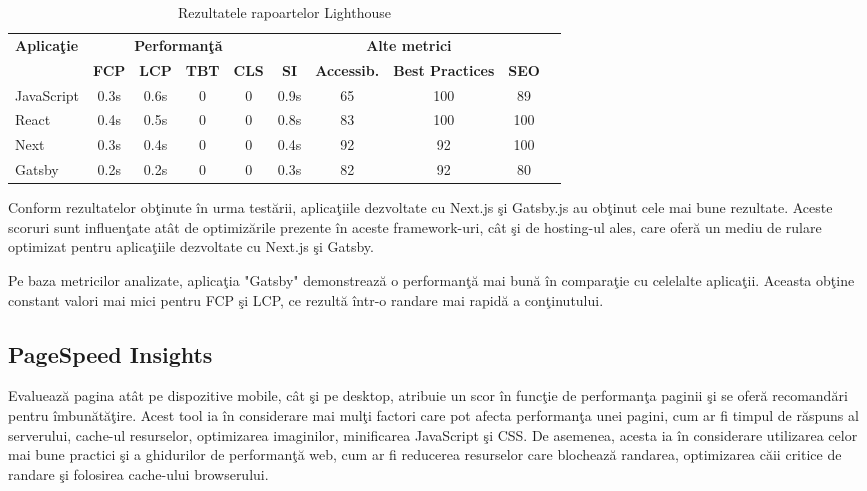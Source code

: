 \documentclass[12pt, a4paper]{report}
\begin{document}
\begin{table}[htbp]
	\centering
	\begin{tabular}{lccccccccc}
		\toprule
		\multirow{2}{*}{\textbf{Aplica\c tie}} & \multicolumn{4}{c}{\textbf{Performan\c t\u a}} & \multicolumn{4}{c}{\textbf{Alte metrici}} \\
		\cmidrule(lr){2-6} \cmidrule(l){7-9}
		& \textbf{FCP} & \textbf{LCP} & \textbf{TBT} & \textbf{CLS} & \textbf{SI} & \textbf{Accessib.} & \textbf{Best Practices} & \textbf{SEO}\\
		\midrule
		JavaScript & 0.3s & 0.6s & 0 & 0 & 0.9s & 65 & 100 & 89 \\
		React & 0.4s & 0.5s & 0 & 0 & 0.8s & 83 & 100 & 100 \\
		Next & 0.3s & 0.4s & 0 & 0 & 0.4s & 92 & 92 & 100 \\
		Gatsby & 0.2s & 0.2s & 0 & 0 & 0.3s & 82 & 92 & 80 \\
		\bottomrule
	\end{tabular}
	\caption{Rezultatele rapoartelor Lighthouse}
	\label{tab:metrics-lighthouse}
\end{table}

Conform rezultatelor ob\c tinute \^in urma test\u arii, aplica\c tiile dezvoltate cu Next.js \c si Gatsby.js au ob\c tinut cele mai bune rezultate. Aceste scoruri sunt influen\c tate at\^at de optimiz\u arile prezente \^in aceste framework-uri, c\^at \c si de hosting-ul ales, care ofer\u a un mediu de rulare optimizat pentru aplica\c tiile dezvoltate cu Next.js \c si Gatsby. 

Pe baza metricilor analizate, aplica\c tia "Gatsby" demonstreaz\u a o performan\c t\u a mai bun\u a \^in compara\c tie cu celelalte aplica\c tii. Aceasta ob\c tine constant valori mai mici pentru FCP \c si LCP, ce rezult\u a \^intr-o randare mai rapid\u a a con\c tinutului. 

\subsection{PageSpeed Insights}

Evalueaz\u a pagina at\^at pe dispozitive mobile, c\^at \c si pe desktop, atribuie un scor \^in func\c tie de performan\c ta paginii \c si se ofer\u a recomand\u ari pentru \^imbun\u at\u a\c tire. Acest tool ia \^in considerare mai mul\c ti factori care pot afecta performan\c ta unei pagini, cum ar fi timpul de r\u aspuns al serverului, cache-ul resurselor, optimizarea imaginilor, minificarea JavaScript \c si CSS. De asemenea, acesta ia \^in considerare utilizarea celor mai bune practici \c si a ghidurilor de performan\c t\u a web, cum ar fi reducerea resurselor care blocheaz\u a randarea, optimizarea c\u aii critice de randare \c si folosirea cache-ului browserului.
\end{document}
